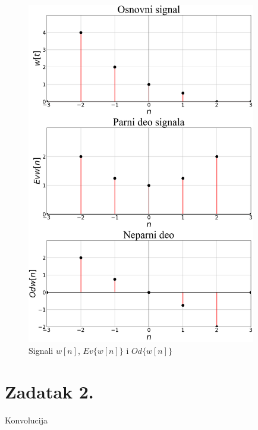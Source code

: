 \documentclass[titlepage,a4paper,12pt]{article}
\begin{document}
	\begin{figure}[ht]
		\centering
		\includegraphics[width=10cm]{Images/zadatak1pic4.png}
		\caption{Signali $w[n]$, $Ev\{w[n]\}$ i $Od\{w[n]\}$}\label{fig:slika4}
	\end{figure}
	\FloatBarrier
	\pagebreak
	
	\clearpage
	
	
	\section{Zadatak 2.}
	\Large{Konvolucija}
	\normalsize{}
	
\end{document}
